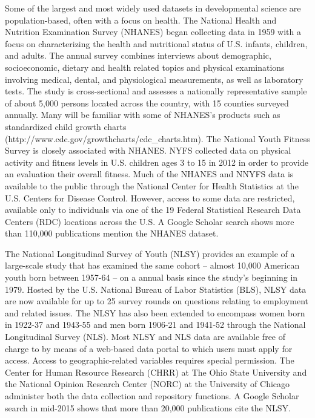 \documentclass[letterpaper,man,apacite]{apa6}
\begin{document}
Some of the largest and most widely used datasets in developmental science are population-based, often with a focus on health.
The National Health and Nutrition Examination Survey (NHANES) \cite{NHANES} began collecting data in 1959 with a focus on characterizing the health and nutritional status of U.S. infants, children, and adults. 
The annual survey combines interviews about demographic, socioeconomic, dietary and health related topics and physical examinations involving medical, dental, and physiological measurements, as well as laboratory tests.
The study is cross-sectional and assesses a nationally representative sample of about 5,000 persons located across the country, with 15 counties surveyed annually.
Many will be familiar with some of NHANES's products such as standardized child growth charts (http://www.cdc.gov/growthcharts/cdc_charts.htm).
The National Youth Fitness Survey \cite{NYFS} is closely associated with NHANES.
NYFS collected data on physical activity and fitness levels in U.S. children ages 3 to 15 in 2012 in order to provide an evaluation their overall fitness.
Much of the NHANES and NNYFS data is available to the public through the National Center for Health Statistics at the U.S. Centers for Disease Control.
However, access to some data are restricted, available only to individuals via one of the 19 Federal Statistical Research Data Centers (RDC) locations across the U.S.
A Google Scholar search shows more than 110,000 publications mention the NHANES dataset.

The National Longitudinal Survey of Youth (NLSY) \cite{NLSY} provides an example of a large-scale study that has examined the same cohort -- almost 10,000 American youth born between 1957-64 -- on a annual basis since the study's beginning in 1979.
Hosted by the U.S. National Bureau of Labor Statistics (BLS), NLSY data are now available for up to 25 survey rounds on questions relating to employment and related issues.
The NLSY has also been extended to encompass women born in 1922-37 and 1943-55 and men born 1906-21 and 1941-52 through the National Longitudinal Survey (NLS).
Most NLSY and NLS data are available free of charge to by means of a web-based data portal \cite{NLSY_data} to which users must apply for access.
Access to geographic-related variables requires special permission.
The Center for Human Resource Research (CHRR) at The Ohio State University and the National Opinion Research Center (NORC) at the University of Chicago administer both the data collection and repository functions.
A Google Scholar search in mid-2015 shows that more than 20,000 publications cite the NLSY.
\end{document}
